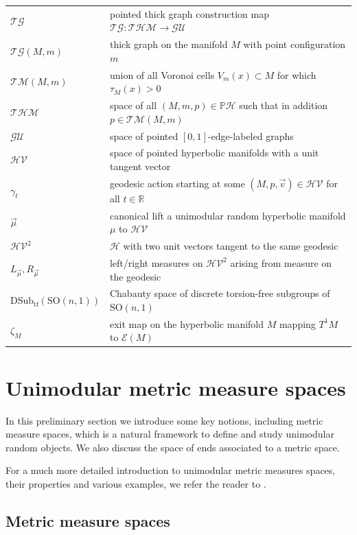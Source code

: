 \documentclass{amsart}
\newcommand{\Points}{\mathbb{P}}
\newcommand{\GraphsU}{\mathcal{GU}}
\newcommand{\Hypers}{\mathcal{H}}
\newcommand{\HypersP}{\Points\Hypers}
\newcommand{\HypersV}{\mathcal{HV}}
\newcommand{\ThickGraph}{\mathcal{TG}}
\newcommand{\ThickHypersP}{\mathcal{THM}}
\newcommand{\ThickManifold}[2]{\mathcal{TM}(#1,#2)}
\newcommand{\DSubtf}[1]{\mathrm{DSub}_\mathrm{tf}\left(#1\right)}
\newcommand{\Ends}[1]{\mathcal{E}\left(#1\right)}
\theoremstyle{plain}
\numberwithin{equation}{section}
\theoremstyle{definition}
\begin{document}
\begin{center}
\begin{longtable}{ll}
$\ThickGraph$ & pointed thick graph construction map $\ThickGraph : \ThickHypersP\to\GraphsU$\\
$\ThickGraph(M,m)$ & thick graph on the manifold $M$ with point configuration $m$\\
$\ThickManifold{M}{m}$ &union of all Voronoi cells $V_m(x) \subset M$ for which $\tau_M(x) > 0$ \\
$\ThickHypersP$ & space of all $(M,m,p) \in \HypersP$ such that in addition $p \in \ThickManifold{M}{m}$\\
$\GraphsU$ & space of pointed $\left[0,1\right]$-edge-labeled graphs\\
\hline
$\HypersV$ & space of pointed hyperbolic manifolds with a unit tangent vector\\
$\gamma_t$ & geodesic action starting at some $(M,p,\vec v) \in \HypersV$ for all $t \in \mathbb{R}$\\
$\vec \mu$ & canonical lift a unimodular random hyperbolic manifold $\mu$ to $\HypersV$\\
$\HypersV^2$ & $\Hypers$ with two unit vectors tangent to the same geodesic\\
$L_{\vec \mu}, R_{\vec \mu}$ & left/right measures on $\HypersV^2$ arising from measure on the geodesic\\
$\DSubtf{\mathrm{SO}(n,1)}$ & Chabauty space of discrete torsion-free subgroups of $\mathrm{SO}(n,1)$\\
$\zeta_M$ & exit map on the hyperbolic manifold $M$ mapping $T^1 M$ to $\Ends{M}$\\
\hline
\end{longtable}
\end{center}



\section{Unimodular metric measure spaces}
\label{sec:unimodular}

In this preliminary section we introduce some key notions, including metric measure spaces, which is a natural framework to define and study unimodular random objects. We also discuss the space of ends associated to a metric space. 

For a much more detailed introduction to unimodular metric measures spaces, their properties and various examples, we refer the reader to \cite{khezeli2023unimodular}.

\subsection{Metric measure spaces}
\label{subsec:mms}
\end{document}
